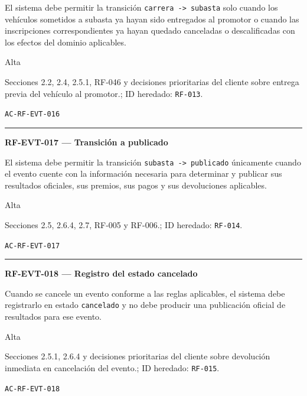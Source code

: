 \documentclass[10pt,letterpaper]{article}
\begin{document}
\begin{description}[style=nextline,leftmargin=3.15cm,labelwidth=2.8cm,font=\normalfont\bfseries]
\item[Obligación] El sistema debe permitir la transición \texttt{carrera -> subasta} solo cuando los vehículos sometidos a subasta ya hayan sido entregados al promotor o cuando las inscripciones correspondientes ya hayan quedado canceladas o descalificadas con los efectos del dominio aplicables.
\item[Prioridad] Alta
\item[Procedencia] Secciones 2.2, 2.4, 2.5.1, RF-046 y decisiones prioritarias del cliente sobre entrega previa del vehículo al promotor.; ID heredado: \texttt{RF-013}.
\item[Verificación] \texttt{AC-RF-EVT-016}
\end{description}
\vspace{0.25em}\hrule\vspace{0.65em}
\noindent\textbf{RF-EVT-017 --- Transición a publicado}\par
\begin{description}[style=nextline,leftmargin=3.15cm,labelwidth=2.8cm,font=\normalfont\bfseries]
\item[Obligación] El sistema debe permitir la transición \texttt{subasta -> publicado} únicamente cuando el evento cuente con la información necesaria para determinar y publicar sus resultados oficiales, sus premios, sus pagos y sus devoluciones aplicables.
\item[Prioridad] Alta
\item[Procedencia] Secciones 2.5, 2.6.4, 2.7, RF-005 y RF-006.; ID heredado: \texttt{RF-014}.
\item[Verificación] \texttt{AC-RF-EVT-017}
\end{description}
\vspace{0.25em}\hrule\vspace{0.65em}
\noindent\textbf{RF-EVT-018 --- Registro del estado cancelado}\par
\begin{description}[style=nextline,leftmargin=3.15cm,labelwidth=2.8cm,font=\normalfont\bfseries]
\item[Obligación] Cuando se cancele un evento conforme a las reglas aplicables, el sistema debe registrarlo en estado \texttt{cancelado} y no debe producir una publicación oficial de resultados para ese evento.
\item[Prioridad] Alta
\item[Procedencia] Secciones 2.5.1, 2.6.4 y decisiones prioritarias del cliente sobre devolución inmediata en cancelación del evento.; ID heredado: \texttt{RF-015}.
\item[Verificación] \texttt{AC-RF-EVT-018}
\end{description}
\end{document}
